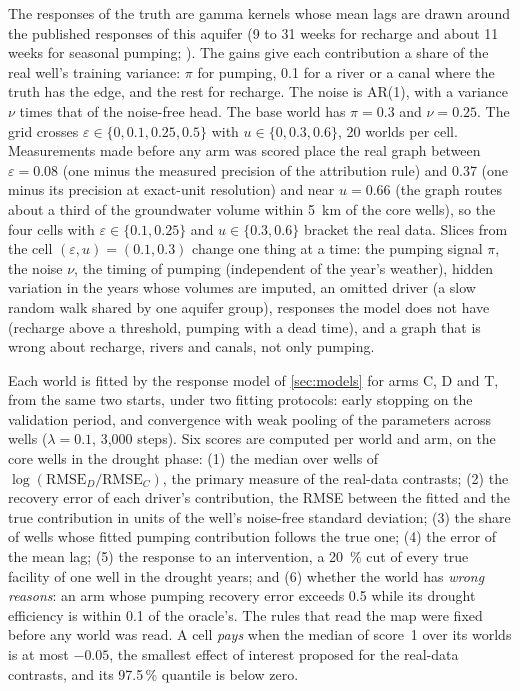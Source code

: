 The responses of the truth are gamma kernels whose mean lags are drawn around the published
responses of this aquifer (9 to 31 weeks for recharge and about 11 weeks for seasonal pumping;
\citealp{Caballero2015Impact}). The gains give each contribution a share of the real well's
training variance: $\pi$ for pumping, 0.1 for a river or a canal where the truth has the edge, and
the rest for recharge. The noise is AR(1), with a variance $\nu$ times that of the noise-free head.
The base world has $\pi = 0.3$ and $\nu = 0.25$. The grid crosses $\varepsilon \in \{0, 0.1, 0.25,
0.5\}$ with $u \in \{0, 0.3, 0.6\}$, 20 worlds per cell. Measurements made before any arm was
scored place the real graph between $\varepsilon = 0.08$ (one minus the measured precision of
the attribution rule) and 0.37 (one minus its precision at exact-unit resolution) and near $u = 0.66$ (the graph
routes about a third of the groundwater volume within \SI{5}{km} of the core wells), so the four
cells with $\varepsilon \in \{0.1, 0.25\}$ and $u \in \{0.3, 0.6\}$ bracket the real data. Slices
from the cell $(\varepsilon, u) = (0.1, 0.3)$ change one thing at a time: the pumping signal
$\pi$, the noise $\nu$, the timing of pumping (independent of the year's weather), hidden variation
in the years whose volumes are imputed, an omitted driver (a slow random walk shared by one aquifer
group), responses the model does not have (recharge above a threshold, pumping with a dead time),
and a graph that is wrong about recharge, rivers and canals, not only pumping.

Each world is fitted by the response model of \cref{sec:models} for arms C, D and T, from the
same two starts, under two fitting protocols: early stopping on the validation period, and
convergence with weak pooling of the parameters across wells ($\lambda = 0.1$, 3,000 steps).
Six scores are computed per world and arm, on the core wells in the drought phase: (1) the median
over wells of $\log(\mathrm{RMSE}_D / \mathrm{RMSE}_C)$, the primary measure of the real-data
contrasts; (2) the recovery error of each driver's contribution, the RMSE between the fitted and
the true contribution in units of the well's noise-free standard deviation; (3) the share of wells
whose fitted pumping contribution follows the true one; (4) the error of the mean lag; (5) the
response to an intervention, a \SI{20}{\percent} cut of every true facility of one well in the
drought years; and (6) whether the world has \emph{wrong reasons}: an arm whose pumping recovery
error exceeds 0.5 while its drought efficiency is within 0.1 of the oracle's. The rules that read
the map were fixed before any world was read. A cell \emph{pays} when the median of score~1 over
its worlds is at most $-0.05$, the smallest effect of interest proposed for the real-data contrasts,
and its 97.5\,\% quantile is below zero. %

